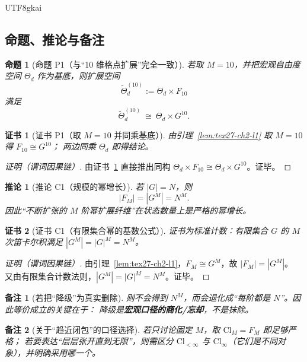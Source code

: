 \documentclass[12pt]{article}
\newtheorem{proposition}{命题}[section]
\newtheorem{corollary}{推论}[section]
\newtheorem{remark}{备注}[section]
\newtheorem{Certificate}{证书}[section]
\begin{document}
\begin{CJK*}{UTF8}{gkai}
\subsection{命题、推论与备注}
\label{subsec:tex27-ch2-others}

\begin{proposition}[命题 P1（与“10 维格点扩展”完全一致）]
\label{prop:tex27-ch2-p1}
若取 $M=10$，并把宏观自由度空间 $\Theta_d$ 作为基底，则扩展空间
\[
  \widetilde{\Theta}_d^{(10)}:=\Theta_d\times F_{10}
\]
满足
\[
  \widetilde{\Theta}_d^{(10)}\ \cong\ \Theta_d\times G^{10}.
\]
\end{proposition}

\begin{Certificate}[证书 P1（取 $M=10$ 并同乘基底）]
\label{cert:tex27-ch2-p1}
由引理~\ref{lem:tex27-ch2-l1} 取 $M=10$ 得 $F_{10}\cong G^{10}$；
两边同乘 $\Theta_d$ 即得结论。
\end{Certificate}

\begin{proof}[证明（谓词因果链）]
由证书~\ref{cert:tex27-ch2-p1} 直接推出同构 $\Theta_d\times F_{10}\cong \Theta_d\times G^{10}$。证毕。
\end{proof}

\begin{corollary}[推论 C1（规模的幂增长）]
\label{cor:tex27-ch2-c1}
若 $|G|=N$，则
\[
  |F_M|=|G^{M}|=N^{M}.
\]
因此“不断扩张的 $M$ 阶幂扩展纤维”在状态数量上是严格的幂增长。
\end{corollary}

\begin{Certificate}[证书 C1（有限集合幂的基数公式）]
\label{cert:tex27-ch2-c1}
证书为标准计数：有限集合 $G$ 的 $M$ 次笛卡尔积满足 $|G^{M}|=|G|^{M}=N^{M}$。
\end{Certificate}

\begin{proof}[证明（谓词因果链）]
由引理~\ref{lem:tex27-ch2-l1}，$F_M\cong G^{M}$，故 $|F_M|=|G^{M}|$。
又由有限集合计数法则，$|G^{M}|=|G|^{M}=N^{M}$。证毕。
\end{proof}

\begin{remark}[若把“降级”为真实删除]
则不会得到 $N^{M}$，而会退化成“每阶都是 $N$”。因此等价成立的关键在于：
降级是\textbf{宏观口径的商化/忘却}，不是抹除。
\end{remark}

\begin{remark}[关于“趋近闭包”的口径选择]
若只讨论固定 $M$，取 $\mathrm{Cl}_M=F_M$ 即足够严格；
若要表达“层层张开直到无限”，则需区分 $\mathrm{Cl}_{<\infty}$ 与 $\mathrm{Cl}_{\infty}$（它们是不同对象），并明确采用哪一个。
\end{remark}


\end{CJK*}
\end{document}

